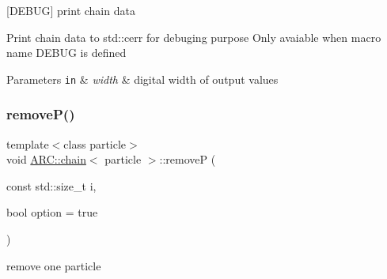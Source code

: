 \mbox{[}D\+E\+B\+UG\mbox{]} print chain data 

Print chain data to std\+::cerr for debuging purpose Only avaiable when macro name D\+E\+B\+UG is defined 
\begin{DoxyParams}[1]{Parameters}
\mbox{\tt in}  & {\em width} & digital width of output values \\
\hline
\end{DoxyParams}
\hypertarget{classARC_1_1chain_a6c622f6f09a11f81a72e26de0c8cbfc8}{}\label{classARC_1_1chain_a6c622f6f09a11f81a72e26de0c8cbfc8} 
\subsubsection{\texorpdfstring{remove\+P()}{removeP()}}
{\footnotesize\ttfamily template$<$class particle$>$ \\
void \hyperlink{classARC_1_1chain}{A\+R\+C\+::chain}$<$ particle $>$\+::removeP (\begin{DoxyParamCaption}\item[{const std\+::size\+\_\+t}]{i,  }\item[{bool}]{option = {\ttfamily true} }\end{DoxyParamCaption})\hspace{0.3cm}{\ttfamily [inline]}}



remove one particle 

